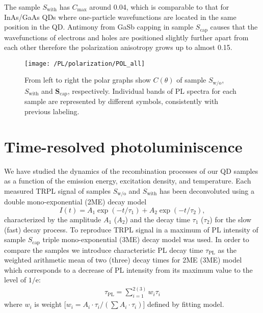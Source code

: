   The sample ${S_\mathrm{with}}$ has $C_\mathrm{max}$ around 0.04, which is comparable to that for InAs/GaAs QDs where one-particle wavefunctions are located in the same position in the QD. Antimony from GaSb capping in sample ${S_\mathrm{cap}}$ causes that the wavefunctions of electrons and holes are positioned slightly further apart from each other therefore the polarization anisotropy grows up to almost 0.15.
  
\begin{figure}
	\centering
	\texttt{[image: /PL/polarization/POL\_all]}
	\caption{From left to right the polar graphs show $C(\theta)$ of sample ${S_\mathrm{w/o}}$, ${S_\mathrm{with}}$ and $\mathbf{S_\mathrm{cap}}$, respectively. Individual bands of PL spectra for each sample are represented by different symbols, consistently with previous labeling.}
	\label{fig:PL_pol_all}
\end{figure}

\newpage
\section{Time-resolved photoluminiscence}
We have studied the dynamics of the recombination processes of our QD samples as a function of the emission energy, excitation density, and temperature. Each measured TRPL signal of samples $S_\mathrm{w/o}$ and $S_\mathrm{with}$ has been deconvoluted using a double mono-exponential (2ME) decay model
%
\begin{equation}
I(t)=A_1\exp(-t/\tau_1)+A_2\exp(-t/\tau_2),
\end{equation}
 characterized by the amplitude $A_1$ ($A_2$) and the decay time $\tau_1$ ($\tau_2$) for the slow (fast) decay process.
 To reproduce TRPL signal in a maximum of PL intensity of sample $S_\mathrm{cap}$ triple mono-exponential (3ME) decay model was used.
 In order to compare the samples we introduce characteristic PL decay time $\tau_\mathrm{PL}$ as the weighted arithmetic mean of two (three) decay times for 2ME (3ME) model which corresponds to a decrease of PL intensity from its maximum value to the level of $1/\mathrm{e}$:
%
\begin{eqnarray}
\tau_\mathrm{PL}=\sum_{i=1}^{2 ( 3) } w_i\tau_i \label{eq:average_time}
\end{eqnarray}
%
where $w_i$ is weight [$w_i={A_i\cdot \tau_i }/{(\sum A_i \cdot \tau_i)}$] defined by fitting model.

